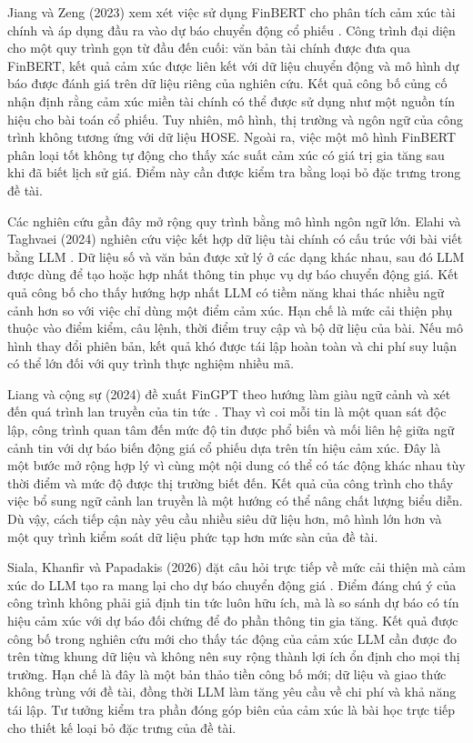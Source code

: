 Jiang và Zeng (2023) xem xét việc sử dụng FinBERT cho phân tích cảm xúc tài chính
và áp dụng đầu ra vào dự báo chuyển động cổ phiếu \cite{Jiang2023_230602136v3}.
Công trình đại diện cho một quy trình gọn từ đầu đến cuối: văn bản tài chính được đưa qua
FinBERT, kết quả cảm xúc được liên kết với dữ liệu chuyển động và mô hình dự báo
được đánh giá trên dữ liệu riêng của nghiên cứu. Kết quả công bố củng cố nhận định
rằng cảm xúc miền tài chính có thể được sử dụng như một nguồn tín hiệu cho bài toán
cổ phiếu. Tuy nhiên, mô hình, thị trường và ngôn ngữ của công trình không
tương ứng với dữ liệu HOSE. Ngoài ra, việc một mô hình FinBERT phân loại tốt không tự động cho
thấy xác suất cảm xúc có giá trị gia tăng sau khi đã biết lịch sử giá. Điểm này cần
được kiểm tra bằng loại bỏ đặc trưng trong đề tài.

Các nghiên cứu gần đây mở rộng quy trình bằng mô hình ngôn ngữ lớn. Elahi và Taghvaei
(2024) nghiên cứu việc kết hợp dữ liệu tài chính có cấu trúc với bài viết bằng LLM
\cite{Elahi2024_241101368v1}. Dữ liệu số và văn bản được xử lý ở các dạng khác nhau,
sau đó LLM được dùng để tạo hoặc hợp nhất thông tin phục vụ dự báo chuyển động giá.
Kết quả công bố cho thấy hướng hợp nhất LLM có tiềm năng khai thác nhiều ngữ cảnh hơn
so với việc chỉ dùng một điểm cảm xúc. Hạn chế là mức cải thiện phụ thuộc vào điểm kiểm,
câu lệnh, thời điểm truy cập và bộ dữ liệu của bài. Nếu mô hình thay đổi phiên bản, kết
quả khó được tái lập hoàn toàn và chi phí suy luận có thể lớn đối với quy trình thực
nghiệm nhiều mã.

Liang và cộng sự (2024) đề xuất FinGPT theo hướng làm giàu ngữ cảnh và xét đến quá
trình lan truyền của tin tức \cite{Liang2024_241210823v2}. Thay vì coi mỗi tin là một
quan sát độc lập, công trình quan tâm đến mức độ tin được phổ biến và mối liên hệ giữa
ngữ cảnh tin với dự báo biến động giá cổ phiếu dựa trên tín hiệu cảm xúc. Đây là một bước mở rộng hợp
lý vì cùng một nội dung có thể có tác động khác nhau tùy thời điểm và mức độ được thị
trường biết đến. Kết quả của công trình cho thấy việc bổ sung ngữ cảnh lan truyền là
một hướng có thể nâng chất lượng biểu diễn. Dù vậy, cách tiếp cận này yêu cầu nhiều
siêu dữ liệu hơn, mô hình lớn hơn và một quy trình kiểm soát dữ liệu phức tạp hơn mức sàn
của đề tài.

Siala, Khanfir và Papadakis (2026) đặt câu hỏi trực tiếp về mức cải thiện mà cảm xúc
do LLM tạo ra mang lại cho dự báo chuyển động giá \cite{Siala2026_260200086v3}.
Điểm đáng chú ý của công trình không phải giả định tin tức luôn hữu ích, mà là so
sánh dự báo có tín hiệu cảm xúc với dự báo đối chứng để đo phần thông tin gia tăng.
Kết quả được công bố trong nghiên cứu mới cho thấy tác động của cảm xúc LLM cần được
đo trên từng khung dữ liệu và không nên suy rộng thành lợi ích ổn định cho mọi thị
trường. Hạn chế là đây là một bản thảo tiền công bố mới; dữ liệu và giao thức không trùng với
đề tài, đồng thời LLM làm tăng yêu cầu về chi phí và khả năng tái lập. Tư tưởng kiểm
tra phần đóng góp biên của cảm xúc là bài học trực tiếp cho thiết kế loại bỏ đặc trưng của
đề tài.

